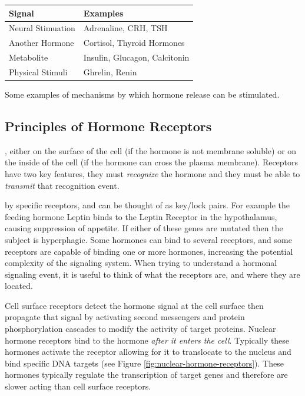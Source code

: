 \documentclass{tufte-handout}
\begin{document}
\begin{margintable}[+1cm]
  \centering
  \begin{tabular}{ll}
    \toprule
    Signal & Examples \\
    \midrule
    Neural Stimuation & Adrenaline, CRH, TSH \\
    Another Hormone & Cortisol, Thyroid Hormones \\
    Metabolite & Insulin, Glucagon, Calcitonin \\
    Physical Stimuli & Ghrelin, Renin \\
    \bottomrule
  \end{tabular}
  \caption{Some examples of mechanisms by which hormone release can be stimulated.}
  \label{tab:secreting-events}
\end{margintable}

\subsection{Principles of Hormone Receptors}

, either on the surface of the cell (if the hormone is not membrane soluble) or on the inside of the cell (if the hormone can cross the plasma membrane).  Receptors have two key features, they must \emph{recognize} the hormone and they must be able to \emph{transmit} that recognition event.

 by specific receptors, and can be thought of as key/lock pairs.  For example the feeding hormone Leptin binds to the Leptin Receptor in the hypothalamus, causing suppression of appetite.  If either of these genes are mutated then the subject is hyperphagic.  Some hormones can bind to several receptors, and some receptors are capable of binding one or more hormones, increasing the potential complexity of the signaling system.  When trying to understand a hormonal signaling event, it is useful to think of what the receptors are, and where they are located.  

  Cell surface receptors detect the hormone signal at the cell surface then propagate that signal by activating second messengers and protein phosphorylation cascades to modify the activity of target proteins.  Nuclear hormone receptors bind to the hormone \emph{after it enters the cell}.  Typically these hormones activate the receptor allowing for it to translocate to the nucleus and bind specific DNA targets (see Figure \ref{fig:nuclear-hormone-receptors}).  These hormones typically regulate the transcription of target genes and therefore are slower acting than cell surface receptors.
\end{document}

